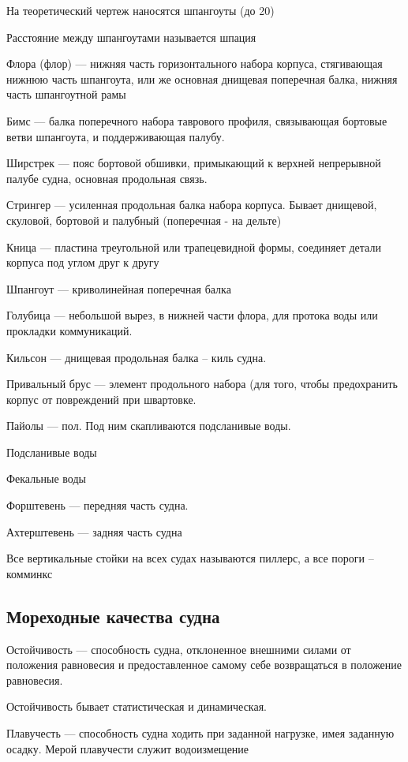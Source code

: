 \documentclass{article}        %
\begin{document}
\begin{description}
На теоретический чертеж наносятся шпангоуты
(до 20)

Расстояние между шпангоутами называется шпация


Флора (флор) --- нижняя часть горизонтального набора корпуса, 
	стягивающая нижнюю часть шпангоута, или же основная
	днищевая поперечная балка, нижняя часть шпангоутной рамы

Бимс --- балка поперечного набора таврового профиля, связывающая 
	бортовые ветви шпангоута, и поддерживающая палубу.


Ширстрек --- пояс бортовой обшивки, примыкающий к верхней непрерывной 
	палубе судна, основная продольная связь.

Стрингер --- усиленная продольная балка набора корпуса. Бывает
	днищевой, скуловой, бортовой и палубный (поперечная - на дельте)

Кница --- пластина треугольной или трапецевидной формы, соединяет детали корпуса под углом друг к другу

Шпангоут --- криволинейная поперечная балка

Голубица --- небольшой вырез, в нижней части флора, для протока воды или прокладки коммуникаций.

Кильсон --- днищевая продольная балка -- киль судна.

Привальный брус --- элемент продольного набора (для того, чтобы предохранить корпус от повреждений
	при швартовке. 

Пайолы --- пол. Под ним скапливаются подсланивые воды.

Подсланивые воды

Фекальные воды

Форштевень --- передняя часть судна.

Ахтерштевень --- задняя часть судна

Все вертикальные стойки на всех судах называются пиллерс, а все пороги -- комминкс




\subsection{Мореходные качества судна}
Остойчивость --- способность судна, отклоненное внешними силами от положения равновесия
	и предоставленное самому себе возвращаться в положение равновесия.

Остойчивость бывает статистическая и динамическая.

Плавучесть --- способность судна ходить при заданной нагрузке, имея заданную осадку.
Мерой плавучести служит водоизмещение


\end{description}
\end{document}
